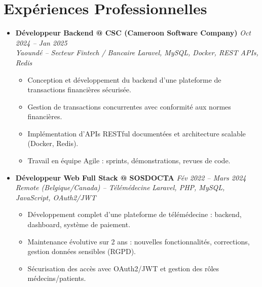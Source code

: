 \documentclass[a4paper,11pt]{article}
\begin{document}
\section{Expériences Professionnelles}
\begin{itemize}[leftmargin=*, label={-}]

\item \textbf{Développeur Backend @ CSC (Cameroon Software Company)} \hfill \textit{Oct 2024 -- Jan 2025} \\
\textit{Yaoundé -- Secteur Fintech / Bancaire} \hfill \textit{Laravel, MySQL, Docker, REST APIs, Redis}
\vspace{-2pt}
    \begin{itemize}[leftmargin=0.4cm, nosep, label=\tiny$\bullet$]
        \item \small{Conception et développement du backend d'une plateforme de transactions financières sécurisée.}
        \item \small{Gestion de transactions concurrentes avec conformité aux normes financières.}
        \item \small{Implémentation d'APIs RESTful documentées et architecture scalable (Docker, Redis).}
        \item \small{Travail en équipe Agile : sprints, démonstrations, revues de code.}
    \end{itemize}
\vspace{3pt}

\item \textbf{Développeur Web Full Stack @ SOSDOCTA} \hfill \textit{Fév 2022 -- Mars 2024} \\
\textit{Remote (Belgique/Canada) -- Télémédecine} \hfill \textit{Laravel, PHP, MySQL, JavaScript, OAuth2/JWT}
\vspace{-2pt}
    \begin{itemize}[leftmargin=0.4cm, nosep, label=\tiny$\bullet$]
        \item \small{Développement complet d'une plateforme de télémédecine : backend, dashboard, système de paiement.}
        \item \small{Maintenance évolutive sur 2 ans : nouvelles fonctionnalités, corrections, gestion données sensibles (RGPD).}
        \item \small{Sécurisation des accès avec OAuth2/JWT et gestion des rôles médecins/patients.}
    \end{itemize}
\vspace{3pt}


\end{itemize}
\end{document}
